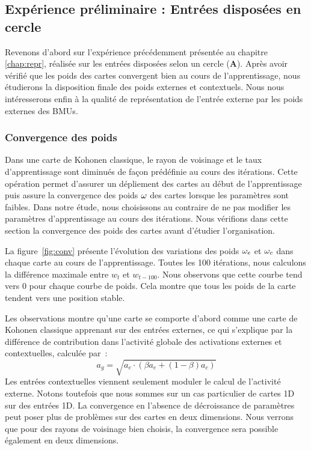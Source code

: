 \documentclass[../main]{subfiles}
\begin{document}
\subsection{Expérience préliminaire : Entrées disposées en cercle}

Revenons d'abord sur l'expérience précédemment présentée au chapitre \ref{chap:repr}, réalisée sur les entrées disposées selon un cercle (\textbf{A}).
Après avoir vérifié que les poids des cartes convergent bien au cours de l'apprentissage, nous étudierons la disposition finale des poids externes et contextuels.
Nous nous intéresserons enfin à la qualité de représentation de l'entrée externe par les poids externes des BMUs.

\subsubsection{Convergence des poids}

Dans une carte de Kohonen classique, le rayon de voisinage et le taux d'apprentissage sont diminués de façon prédéfinie au cours des itérations. 
Cette opération permet d'assurer un dépliement des cartes au début de l'apprentissage puis assure la convergence des poids $\omega$ des cartes lorsque les paramètres sont faibles.
Dans notre étude, nous choisissons au contraire de ne pas modifier les paramètres d'apprentissage au cours des itérations.
Nous vérifions dans cette section la convergence des poids des cartes avant d'étudier l'organisation. 

La figure~\ref{fig:conv} présente l'évolution des variations des poids $\omega_{e}$ et $\omega_{c}$ dans chaque carte au cours de l'apprentissage. Toutes les 100 itérations, nous calculons la différence maximale entre $w_t$ et $w_{t-100}$.
Nous observons que cette courbe tend vers $0$ pour chaque courbe de poids. Cela montre que tous les poids de la carte tendent vers une position stable.

Les observations montre qu'une carte se comporte d'abord comme une carte de Kohonen classique apprenant sur des entrées externes, ce qui s'explique par la différence de contribution dans l'activité globale des activations externes et contextuelles, calculée par~: 
$$ a_g = \sqrt{a_e \cdot (\beta a_e + (1-\beta)a_c)}$$
Les entrées contextuelles viennent seulement moduler le calcul de l'activité externe.
Notons toutefois que nous sommes sur un cas particulier de cartes 1D sur des entrées 1D.
La convergence en l'absence de décroissance de paramètres peut poser plus de problèmes sur des cartes en deux dimensions. 
Nous verrons que pour des rayons de voisinage bien choisis, la convergence sera possible également en deux dimensions.
\end{document}
